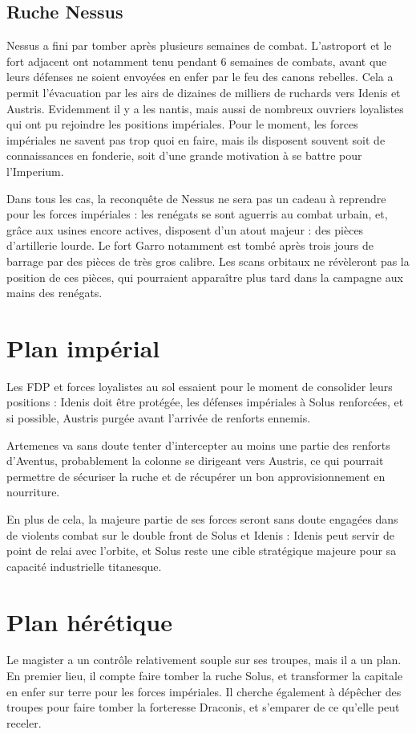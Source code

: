 \documentclass[10pt,a4paper]{book}
\begin{document}
\section{Ruche Nessus}
Nessus a fini par tomber après plusieurs semaines de combat. L'astroport et le fort adjacent ont notamment tenu pendant 6 semaines de combats, avant que leurs défenses ne soient envoyées en enfer par le feu des canons rebelles. Cela a permit l'évacuation par les airs de dizaines de milliers de ruchards vers Idenis et Austris. Evidemment il y a les nantis, mais aussi de nombreux ouvriers loyalistes qui ont pu rejoindre les positions impériales. Pour le moment, les forces impériales ne savent pas trop quoi en faire, mais ils disposent souvent soit de connaissances en fonderie, soit d'une grande motivation à se battre pour l'Imperium.

Dans tous les cas, la reconquête de Nessus ne sera pas un cadeau à reprendre pour les forces impériales : les renégats se sont aguerris au combat urbain, et, grâce aux usines encore actives, disposent d'un atout majeur : des pièces d'artillerie lourde. Le fort Garro notamment est tombé après trois jours de barrage par des pièces de très gros calibre. Les scans orbitaux ne révèleront pas la position de ces pièces, qui pourraient apparaître plus tard dans la campagne aux mains des renégats.
\chapter{Plan impérial}
Les FDP et forces loyalistes au sol essaient pour le moment de consolider leurs positions : Idenis doit être protégée, les défenses impériales à Solus renforcées, et si possible, Austris purgée avant l'arrivée de renforts ennemis.

Artemenes va sans doute tenter d'intercepter au moins une partie des renforts d'Aventus, probablement la colonne se dirigeant vers Austris, ce qui pourrait permettre de sécuriser la ruche et de récupérer un bon approvisionnement en nourriture.

En plus de cela, la majeure partie de ses forces seront sans doute engagées dans de violents combat sur le double front de Solus et Idenis : Idenis peut servir de point de relai avec l'orbite, et Solus reste une cible stratégique majeure pour sa capacité industrielle titanesque.
\chapter{Plan hérétique}
Le magister a un contrôle relativement souple sur ses troupes, mais il a un plan. En premier lieu, il compte faire tomber la ruche Solus, et transformer la capitale en enfer sur terre pour les forces impériales. Il cherche également à dépêcher des troupes pour faire tomber la forteresse Draconis, et s'emparer de ce qu'elle peut receler.
\end{document}
